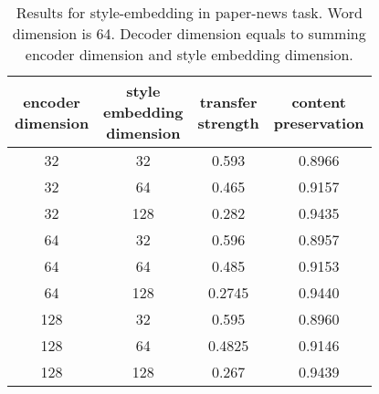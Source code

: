 \documentclass[letterpaper]{article} \usepackage{aaai18}  \usepackage{times}  \usepackage{helvet}  \usepackage{courier}  \usepackage{url}  \usepackage{graphicx}  \usepackage{amsmath}
\begin{document}
\begin{table}[htb]
\centering
\begin{tabular}{|c|c|c|c|}
\hline
\makecell{encoder\\dimension}   & \makecell{style\\embedding\\dimension} & \makecell{transfer\\strength}  & \makecell{content\\preservation}  \\ \hline
32  & 32  & 0.593   & 0.8966   \\
32  & 64  & 0.465   & 0.9157   \\
32  & 128 & 0.282   & 0.9435   \\
64  & 32  & 0.596   & 0.8957   \\
64  & 64  & 0.485   & 0.9153   \\
64  & 128 & 0.2745  & 0.9440   \\
128 & 32  & 0.595   & 0.8960   \\
128 & 64  & 0.4825  & 0.9146   \\
128 & 128 & 0.267   & 0.9439   \\ \hline
\end{tabular}
\caption{Results for style-embedding in paper-news task. Word dimension is 64. Decoder dimension equals to summing encoder dimension and style embedding dimension.}
\label{table_style_embedding}
\end{table}
\end{document}
